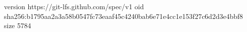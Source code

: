 version https://git-lfs.github.com/spec/v1
oid sha256:b1795aa2a3a58b0547fc73eaaf45c4240bab6e71e4cc1e153f27c6d2d3e4bbf8
size 5784
